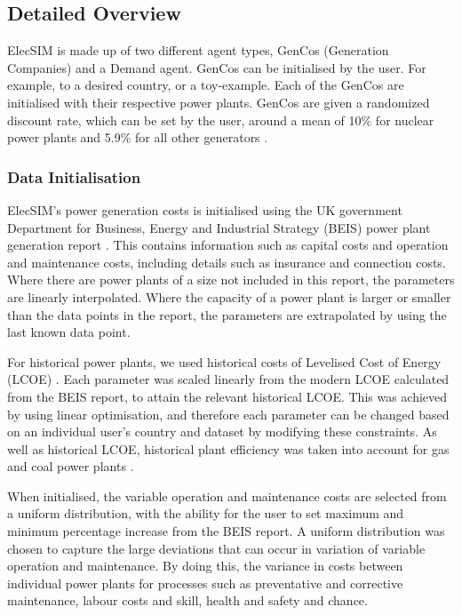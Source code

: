 \subsection{Detailed Overview}

ElecSIM is made up of two different agent types, GenCos (Generation Companies) and a Demand agent. GenCos can be initialised by the user. For example, to a desired country, or a toy-example. Each of the GenCos are initialised with their respective power plants. GenCos are given a randomized discount rate, which can be set by the user, around a mean of 10\% for nuclear power plants \cite{Paper2012} and 5.9\% for all other generators \cite{KPMG2017}.

\subsubsection{Data Initialisation}ElecSIM's power generation costs is initialised using the UK government Department for Business, Energy and Industrial Strategy (BEIS) power plant generation report \cite{Department2016}. This contains information such as capital costs and operation and maintenance costs, including details such as insurance and connection costs. Where there are power plants of a size not included in this report, the parameters are linearly interpolated. Where the capacity of a power plant is larger or smaller than the data points in the report, the parameters are extrapolated by using the last known data point.

For historical power plants, we used historical costs of Levelised Cost of Energy (LCOE) \cite{Dale2013}. Each parameter was scaled linearly from the modern LCOE calculated from the BEIS report, to attain the relevant historical LCOE. This was achieved by using linear optimisation, and therefore each parameter can be changed based on an individual user's country and dataset by modifying these constraints. As well as historical LCOE, historical plant efficiency was taken into account for gas and coal power plants \cite{EIA2013}.

When initialised, the variable operation and maintenance costs are selected from a uniform distribution, with the ability for the user to set maximum and minimum percentage increase from the BEIS report. A uniform distribution was chosen to capture the large deviations that can occur in variation of variable operation and maintenance. By doing this, the variance in costs between individual power plants for processes such as preventative and corrective maintenance, labour costs and skill, health and safety and chance.  

